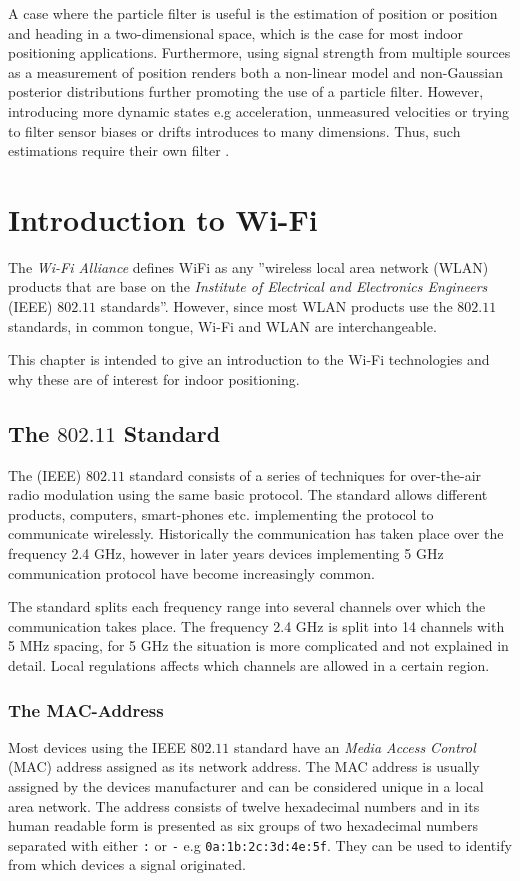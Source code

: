 \documentclass{LTHthesis}
\begin{document}
 A case where the particle filter is useful is the estimation of position or position and heading in a two-dimensional space, which is the case for most indoor positioning applications. Furthermore, using signal strength from multiple sources as a measurement of position renders both a non-linear model and non-Gaussian posterior distributions further promoting the use of a particle filter. However, introducing more dynamic states e.g acceleration, unmeasured velocities or trying to filter sensor biases or drifts introduces to many dimensions. Thus, such estimations require their own filter \cite{gson12}.        
%
\chapter{Introduction to Wi-Fi} %
The \emph{Wi-Fi Alliance} defines WiFi as any ''wireless local area network (WLAN) products that are base on the \emph{Institute of Electrical and Electronics Engineers} (IEEE) $802.11$ standards''. However, since most WLAN products use the $802.11$ standards, in common tongue, Wi-Fi and WLAN are interchangeable.    

This chapter is intended to give an introduction to the Wi-Fi technologies and why these are of interest for indoor positioning.
%
\section{The $802.11$ Standard}
%
The (IEEE) $802.11$ standard consists of a series of techniques for over-the-air radio modulation using the same basic protocol. The standard allows different products, computers, smart-phones etc. implementing the protocol to communicate wirelessly. Historically the communication has taken place over the frequency 2.4 GHz, however in later years devices implementing 5 GHz communication protocol have become increasingly common.

The standard splits each frequency range into several channels over which the communication takes place. The frequency 2.4 GHz is split into 14 channels with 5 MHz spacing, for 5 GHz the situation is more complicated and not explained in detail. Local regulations affects which channels are allowed in a certain region.   
%
\subsection{The MAC-Address}
%
Most devices using the IEEE $802.11$ standard have an \emph{Media Access Control} (MAC) address assigned as its network address. The MAC address is usually assigned by the devices manufacturer and can be considered unique in a local area network. The address consists of twelve hexadecimal numbers and in its human readable form is presented as six groups of two hexadecimal numbers separated with either \verb|:| or \verb|-| e.g \verb|0a:1b:2c:3d:4e:5f|. They can be used to identify from which devices a signal originated.
%
\end{document}
